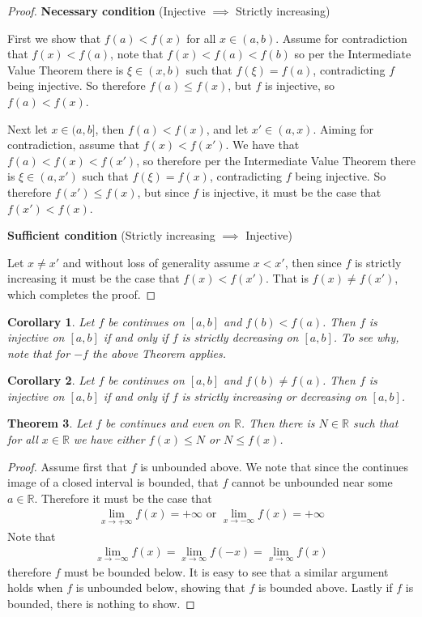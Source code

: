 \documentclass[a4paper,11pt]{article}
\theoremstyle{plain}
\newtheorem{theorem}{Theorem}
\newtheorem{corollary}[theorem]{Corollary}
\theoremstyle{definition}
\newcommand{\R}{\mathbb{R}}
\begin{document}
\begin{proof}
	\textbf{Necessary condition} (Injective $\implies$ Strictly increasing)

	First we show that $f(a)<f(x)$ for all $x\in (a,b)$. Assume
	for contradiction that $f(x)<f(a)$, note that $f(x)<f(a)<f(b)$
	so per the Intermediate Value Theorem there is $\xi\in(x,b)$
	such that $f(\xi)=f(a)$, contradicting $f$ being injective. So
	therefore $f(a)\leq f(x)$, but $f$ is injective, so $f(a)<f(x)$.

	Next let $x\in(a,b]$, then $f(a)<f(x)$, and let $x'\in(a,x)$. Aiming
	for contradiction, assume that $f(x)<f(x')$. We have that
	$f(a)<f(x)<f(x')$, so therefore per the Intermediate Value Theorem
	there is $\xi\in(a,x')$ such that $f(\xi)=f(x)$,  contradicting
	$f$ being injective. So therefore $f(x')\leq f(x)$, but since $f$ is
	injective, it must be the case that $f(x')<f(x)$.

	\textbf{Sufficient condition} (Strictly increasing $\implies$ Injective)

	Let $x\neq x'$ and without loss of generality assume $x<x'$,
	then since $f$ is strictly increasing it must be the case that
	$f(x)<f(x')$. That is $f(x)\neq f(x')$, which completes the proof.
\end{proof}
\begin{corollary}
	Let $f$ be continues on $[a,b]$ and $f(b)<f(a)$. Then $f$ is
	injective on $[a,b]$ if and only if $f$ is strictly decreasing
	on $[a,b]$. To see why, note that for $-f$ the above Theorem applies.
\end{corollary}
\begin{corollary}
	Let $f$ be continues on $[a,b]$ and $f(b)\neq f(a)$. Then $f$
	is injective on $[a,b]$ if and only if $f$ is strictly increasing
	or decreasing on $[a,b]$.
\end{corollary}
\begin{theorem}
	Let $f$ be continues and even on $\R$. Then there is $N\in\R$ such that for
	all $x\in\R$ we have either $f(x)\leq N$ or $N\leq f(x)$.
\end{theorem}
\begin{proof}
	Assume first that $f$ is unbounded above. We note that since
	the continues image of a closed interval is bounded, that $f$
	cannot be unbounded near some $a\in\R$. Therefore it must be
	the case that
	\begin{equation}
	\begin{aligned}
		\lim_{x\rightarrow +\infty}f(x)=+\infty\text{ or }
		\lim_{x\rightarrow -\infty}f(x)=+\infty
	\end{aligned}
	\end{equation}
	Note that
	\begin{equation}
	\begin{aligned}
		\lim_{x\rightarrow -\infty}f(x)=\lim_{x\rightarrow \infty}f(-x)=
		\lim_{x\rightarrow \infty}f(x)
	\end{aligned}
	\end{equation}
	therefore $f$ must be bounded below. It is easy to see that a similar
	argument holds when $f$ is unbounded below, showing that $f$ is bounded
	above. Lastly if $f$ is bounded, there is nothing to show.
\end{proof}
\end{document}
